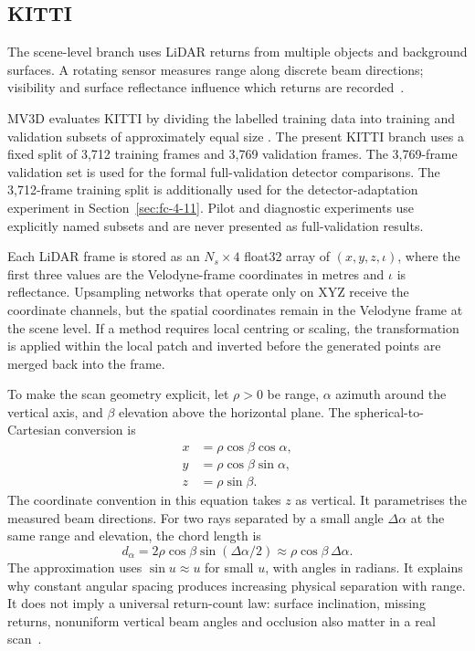 \subsection{KITTI}
\label{sec:fc-4-3-2}
\label{subsec:lidar_scenes}

The scene-level branch uses LiDAR returns from multiple objects and
background surfaces. A rotating sensor measures range along discrete
beam directions; visibility and surface reflectance influence which
returns are recorded~\cite{geiger2013kitti}.

MV3D evaluates KITTI by dividing the labelled training data into training and validation subsets of approximately equal size \cite{chen2017mv3d}. The present KITTI branch uses a fixed split of 3,712 training frames and 3,769 validation frames. The 3,769-frame validation set is used for the formal full-validation detector comparisons. The 3,712-frame training split is additionally used for the detector-adaptation experiment in Section~\ref{sec:fc-4-11}. Pilot and diagnostic experiments use explicitly named subsets and are never presented as full-validation results.

Each LiDAR frame is stored as an $N_s\times4$ float32 array of $(x,y,z,\iota)$, where the first three values are the Velodyne-frame coordinates in metres and $\iota$ is reflectance. Upsampling networks that operate only on XYZ receive the coordinate channels, but the spatial coordinates remain in the Velodyne frame at the scene level. If a method requires local centring or scaling, the transformation is applied within the local patch and inverted before the generated points are merged back into the frame.

To make the scan geometry explicit, let $\rho>0$ be range, $\alpha$ azimuth around the
vertical axis, and $\beta$ elevation above the horizontal plane. The
spherical-to-Cartesian conversion is
\begin{equation}
 \begin{aligned}
 x&=\rho\cos\beta\cos\alpha,\\
 y&=\rho\cos\beta\sin\alpha,\\
 z&=\rho\sin\beta.
 \end{aligned}
 \label{eq:spherical_to_cartesian}
\end{equation}
The coordinate convention in this equation takes $z$ as vertical. It parametrises the measured beam directions. For two rays separated by a small angle
$\Delta\alpha$ at the same range and elevation, the chord length is
\begin{equation}
 d_\alpha=2\rho\cos\beta\sin(\Delta\alpha/2)
 \approx\rho\cos\beta\,\Delta\alpha.
 \label{eq:angular_spacing}
\end{equation}
The approximation uses $\sin u\approx u$ for small $u$, with angles in
radians. It explains why constant angular spacing produces increasing
physical separation with range. It does not imply a universal return-count
law: surface inclination, missing returns, nonuniform vertical beam angles
and occlusion also matter in a real scan~\cite{geiger2013kitti}.


